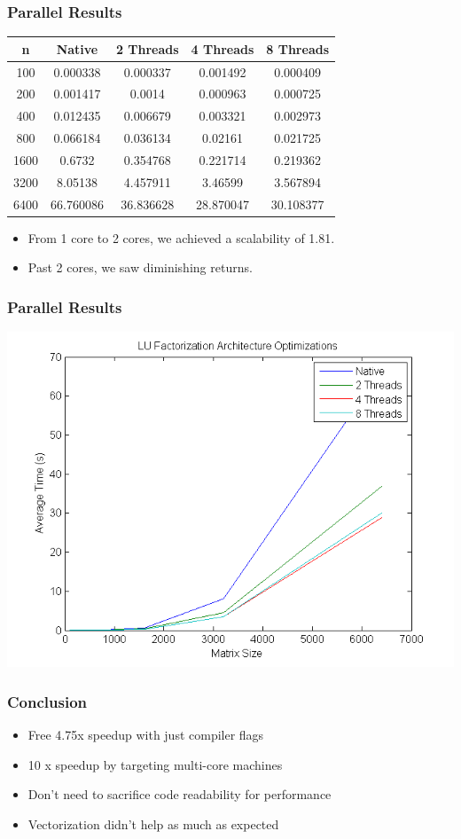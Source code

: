 \documentclass{beamer}
\begin{document}
\begin{frame}[fragile]
\frametitle{Parallel Results}

\begin{center}
\begin{tabular}{|c|c|c|c|c|}
\hline
n & Native & 2 Threads & 4 Threads & 8 Threads\\
\hline
100	& 0.000338 & 	0.000337 & 0.001492	& 0.000409 \\
200	& 0.001417 & 	0.0014 & 0.000963 &	0.000725 \\
400	& 0.012435 & 0.006679 & 0.003321 & 0.002973 \\
800	& 0.066184 & 0.036134 & 0.02161 & 0.021725 \\
1600 & 0.6732 &	0.354768 & 0.221714 & 0.219362 \\
3200 & 8.05138 & 4.457911 & 3.46599 & 3.567894 \\
6400 & 66.760086 & 36.836628 & 28.870047 & 30.108377 \\
\hline
\end{tabular}
\end{center}

\begin{itemize}
\setlength\itemsep{0.25em}
\item From 1 core to 2 cores, we achieved a scalability of 1.81. 
\item Past 2 cores, we saw diminishing returns.  
\end{itemize}

\end{frame}

\begin{frame}
\frametitle{Parallel Results}

\begin{center}
\includegraphics[scale=0.5]{figures/fig5}
\end{center}

\end{frame}

\begin{frame}
\frametitle{Conclusion}
\begin{itemize}
\item Free 4.75x speedup with just compiler flags
\item 10 x speedup by targeting multi-core machines
\item Don't need to sacrifice code readability for performance
\item Vectorization didn't help as much as expected
\end{itemize}
\end{frame}
\end{document}
